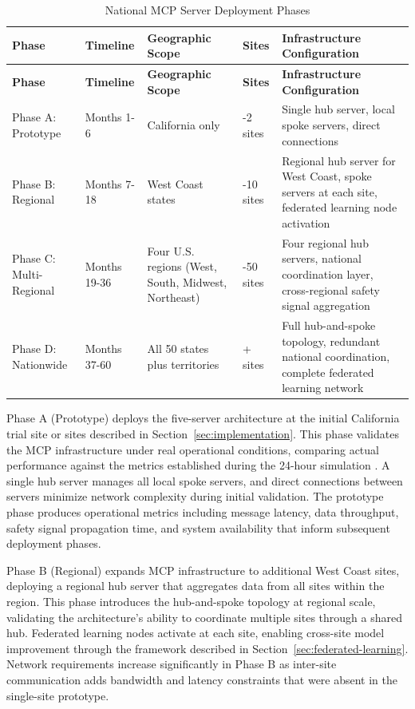 \begin{longtable}{l >{\raggedright\arraybackslash}p{2.2cm} >{\raggedright\arraybackslash}p{2.5cm} >{\raggedright\arraybackslash}p{2.2cm} >{\raggedright\arraybackslash}p{4.0cm}}
\caption{National MCP Server Deployment Phases}
\label{tab:mcp-deployment-phases} \\
\toprule
\textbf{Phase} & \textbf{Timeline} & \textbf{Geographic Scope} & \textbf{Sites} & \textbf{Infrastructure Configuration} \\
\midrule
\endfirsthead
\toprule
\textbf{Phase} & \textbf{Timeline} & \textbf{Geographic Scope} & \textbf{Sites} & \textbf{Infrastructure Configuration} \\
\midrule
\endhead
\bottomrule
\endfoot
\bottomrule
\endlastfoot
Phase A: Prototype & Months 1-6 & California only & 1-2 sites & Single hub server, local spoke servers, direct connections \\
\midrule
Phase B: Regional & Months 7-18 & West Coast states & 5-10 sites & Regional hub server for West Coast, spoke servers at each site, federated learning node activation \\
\midrule
Phase C: Multi-Regional & Months 19-36 & Four U.S. regions (West, South, Midwest, Northeast) & 20-50 sites & Four regional hub servers, national coordination layer, cross-regional safety signal aggregation \\
\midrule
Phase D: Nationwide & Months 37-60 & All 50 states plus territories & 100+ sites & Full hub-and-spoke topology, redundant national coordination, complete federated learning network \\
\end{longtable}

Phase A (Prototype) deploys the five-server architecture at the initial
California trial site or sites described in
Section~\ref{sec:implementation}. This phase validates the MCP infrastructure
under real operational conditions, comparing actual performance against the
metrics established during the 24-hour simulation \cite{site-docs}. A single
hub server manages all local spoke servers, and direct connections between
servers minimize network complexity during initial validation. The prototype
phase produces operational metrics including message latency, data throughput,
safety signal propagation time, and system availability that inform subsequent
deployment phases.

Phase B (Regional) expands MCP infrastructure to additional West Coast sites,
deploying a regional hub server that aggregates data from all sites within the
region. This phase introduces the hub-and-spoke topology at regional scale,
validating the architecture's ability to coordinate multiple sites through a
shared hub. Federated learning nodes activate at each site, enabling cross-site
model improvement through the framework described in
Section~\ref{sec:federated-learning}. Network requirements increase
significantly in Phase B as inter-site communication adds bandwidth and latency
constraints that were absent in the single-site prototype.

